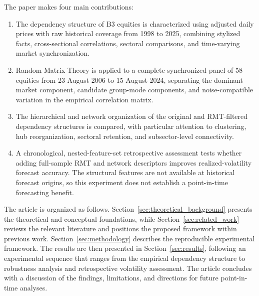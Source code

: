 The paper makes four main contributions:
\begin{enumerate}
\item The dependency structure of B3 equities is characterized using adjusted daily prices with raw historical coverage from 1998 to 2025, combining stylized facts, cross-sectional correlations, sectoral comparisons, and time-varying market synchronization.

\item Random Matrix Theory is applied to a complete synchronized panel of 58 equities from 23 August 2006 to 15 August 2024, separating the dominant market component, candidate group-mode components, and noise-compatible variation in the empirical correlation matrix.

\item The hierarchical and network organization of the original and RMT-filtered dependency structures is compared, with particular attention to clustering, hub reorganization, sectoral retention, and subsector-level connectivity.

\item A chronological, nested-feature-set retrospective assessment tests whether adding full-sample RMT and network descriptors improves realized-volatility forecast accuracy. The structural features are not available at historical forecast origins, so this experiment does not establish a point-in-time forecasting benefit.
\end{enumerate}

The article is organized as follows. Section~\ref{sec:theoretical_background} presents the theoretical and conceptual foundations, while Section~\ref{sec:related_work} reviews the relevant literature and positions the proposed framework within previous work. Section~\ref{sec:methodology} describes the reproducible experimental framework. The results are then presented in Section~\ref{sec:results}, following an experimental sequence that ranges from the empirical dependency structure to robustness analysis and retrospective volatility assessment. The article concludes with a discussion of the findings, limitations, and directions for future point-in-time analyses.

